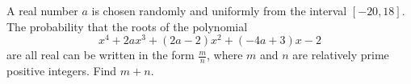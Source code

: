 A real number $a$ is chosen randomly and uniformly from the interval $[-20, 18]$. The probability that the roots of the polynomial \[x^4 + 2ax^3 + (2a-2)x^2 + (-4a+3)x - 2\]are all real can be written in the form $\tfrac{m}{n}$,  where $m$ and $n$ are relatively prime positive integers. Find $m+n$.